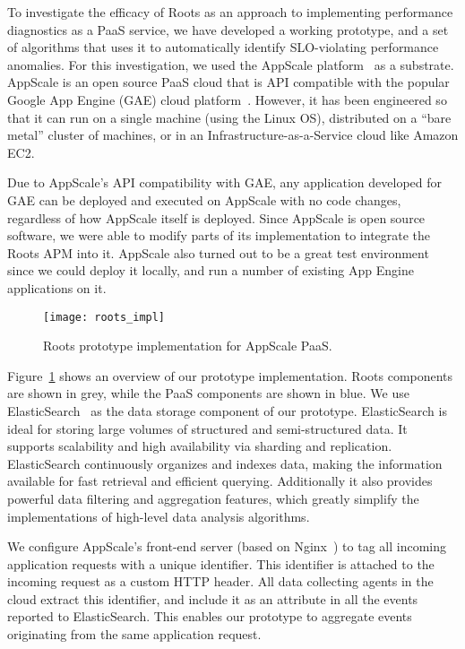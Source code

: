 To investigate the efficacy of Roots as an approach to
implementing performance diagnostics as a PaaS service, we have developed a
working prototype, and a set of algorithms that uses it to automatically
identify SLO-violating performance anomalies.
For this investigation, we used the AppScale
platform~\cite{6488671} as a substrate. AppScale is an open source PaaS cloud
that is API compatible
with the popular Google App Engine (GAE) cloud platform~\cite{gae}.  
However, it has been engineered so that it can run on a
single machine (using the Linux OS), distributed on a ``bare metal'' cluster
of machines, or in an Infrastructure-as-a-Service cloud like Amazon EC2.

Due to AppScale's
API compatibility with GAE, any application developed for GAE can be deployed and
executed on AppScale with no code changes, regardless of how AppScale itself is
deployed. Since AppScale is open source
software, we were able to modify parts of its implementation to integrate the
Roots APM into it. AppScale also turned out to be a great test environment
since we could deploy it locally, and run a number of existing App Engine
applications on it.

\begin{figure}
\centering
\texttt{[image: roots\_impl]}
\caption{Roots prototype implementation for AppScale PaaS.}
\label{fig:roots_impl}
\end{figure}

Figure~\ref{fig:roots_impl} shows an overview of our prototype implementation. Roots components
are shown in grey, while the PaaS components are shown in blue.
We use ElasticSearch~\cite{elasticsearch} as the data storage component of our prototype. ElasticSearch is ideal 
for storing large volumes of structured and semi-structured data. It supports scalability and 
high availability via sharding and replication.
ElasticSearch continuously organizes and indexes data, making the information available 
for fast retrieval and efficient querying. Additionally it also provides
powerful data filtering and aggregation features, which greatly simplify the implementations of high-level
data analysis algorithms.

We configure AppScale's front-end server (based on Nginx~\cite{XXX}) to tag all incoming application requests
with a unique identifier. This identifier is attached to the incoming request as a custom HTTP header.
All data collecting agents in the cloud extract this identifier, and include it as an attribute
in all the events reported to ElasticSearch. This enables our prototype to aggregate events originating
from the same application request.

